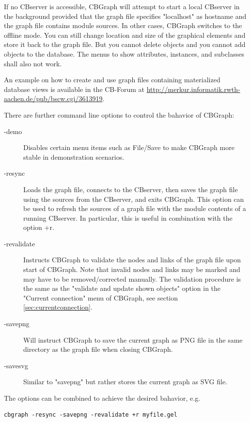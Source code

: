 If no CBserver is accessible, CBGraph will attempt to start a local CBserver in the background
provided that the graph file specifies "localhost" as hostname and the graph file contains module sources.
In other cases, CBGraph switches to the offline mode. You can still change location
and size of the graphical elements and store it back to the graph file. But you cannot delete
objects and you cannot add objects to the database. The menus to show attributes, instances,
and subclasses shall also not work.

An example on how to create and use graph files containing materialized database views
is available in the CB-Forum at
\url{http://merkur.informatik.rwth-aachen.de/pub/bscw.cgi/3613919}.

There are further command line options to control the bahavior of CBGraph:

\begin{description}
\item[-demo] Disables certain menu items such as File/Save to make CBGraph more stable in demonstration
   scenarios.
\item[-resync] Loads the graph file, connects to the CBserver, then saves the graph file using the sources from the
CBserver, and exits CBGraph. This option can be used to refresh the sources of a graph file with the module contents
of a running CBserver. In particular, this is useful in combination with the option +r.
\item[-revalidate] Instructs CBGraph to validate the nodes and links of the graph file upon start of CBGraph.
Note that invalid nodes and links may be marked and may have to be removed/corrected manually. The validation
procedure is the same as the "validate and update shown objects" option in the "Current connection" menu of
CBGraph, see section \ref{sec:currentconnection}.
\item[-savepng] Will instruct CBGraph to save the current graph as PNG file in the same directory
as the graph file when closing CBGraph.
\item[-savesvg] Similar to "savepng" but rather stores the current graph as SVG file.
\end{description}

The options can be combined to achieve the desired bahavior, e.g.\

{\small
\begin{verbatim}
cbgraph -resync -savepng -revalidate +r myfile.gel
\end{verbatim}
}

